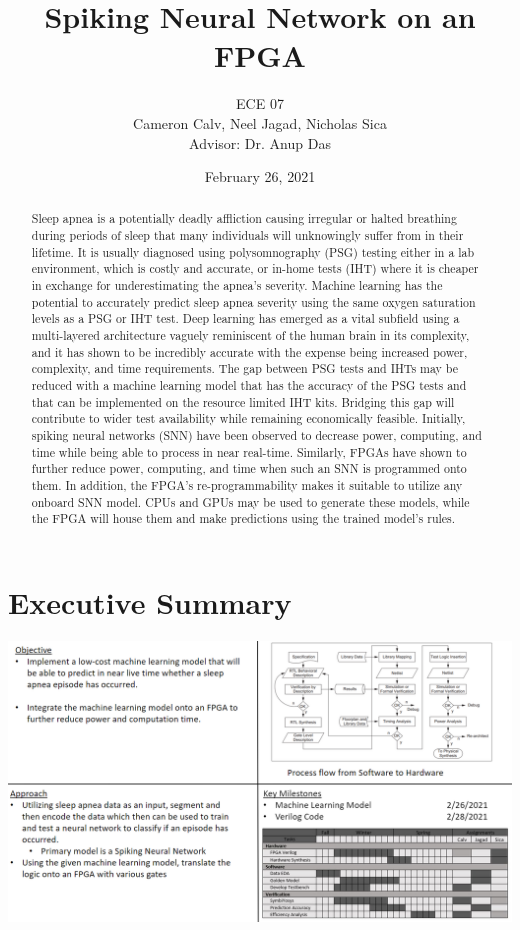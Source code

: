 \documentclass[12pt,titlepage]{article}
\title{Spiking Neural Network on an FPGA}
\author{ECE 07\\{\small{Cameron Calv, Neel Jagad, Nicholas Sica}}\\{\small{Advisor: Dr. Anup Das}}}
\date{February 26, 2021}
\begin{document}
\maketitle
\newpage
\clearpage
{}

\begin{abstract}
Sleep apnea is a potentially deadly affliction causing irregular or halted breathing during periods of sleep that many individuals will unknowingly suffer from in their lifetime. It is usually diagnosed using polysomnography (PSG) testing either in a lab environment, which is costly and accurate, or in-home tests (IHT) where it is cheaper in exchange for underestimating the apnea’s severity. Machine learning has the potential to accurately predict sleep apnea severity using the same oxygen saturation levels as a PSG or IHT test. Deep learning has emerged as a vital subfield using a multi-layered architecture vaguely reminiscent of the human brain in its complexity, and it has shown to be incredibly accurate with the expense being increased power, complexity, and time requirements. The gap between PSG tests and IHTs may be reduced with a machine learning model that has the accuracy of the PSG tests and that can be implemented on the resource limited IHT kits. Bridging this gap will contribute to wider test availability while remaining economically feasible. Initially, spiking neural networks (SNN) have been observed to decrease power, computing, and time while being able to process in near real-time. Similarly, FPGAs have shown to further reduce power, computing, and time when such an SNN is programmed onto them. In addition, the FPGA’s re-programmability makes it suitable to utilize any onboard SNN model. CPUs and GPUs may be used to generate these models, while the FPGA will house them and make predictions using the trained model’s rules. 
\end{abstract}

\tableofcontents

\listoffigures

\listoftables

\newpage


\section{Executive Summary}
\begin{table}[!htb]

	\label{tbl:gantt}
	\includegraphics[width=\linewidth]{quadchart.png}
\end{table}
\end{document}
